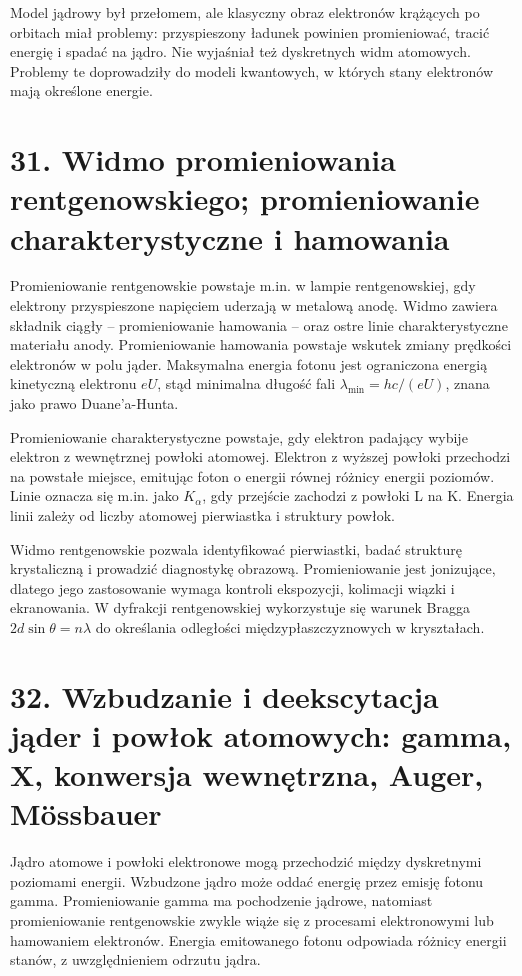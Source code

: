 \documentclass[11pt,a4paper,oneside]{report}
\begin{document}
Model jądrowy był przełomem, ale klasyczny obraz elektronów krążących po orbitach miał problemy: przyspieszony ładunek powinien promieniować, tracić energię i spadać na jądro. Nie wyjaśniał też dyskretnych widm atomowych. Problemy te doprowadziły do modeli kwantowych, w których stany elektronów mają określone energie.

\section{31. Widmo promieniowania rentgenowskiego; promieniowanie charakterystyczne i hamowania}
Promieniowanie rentgenowskie powstaje m.in. w lampie rentgenowskiej, gdy elektrony przyspieszone napięciem uderzają w metalową anodę. Widmo zawiera składnik ciągły – promieniowanie hamowania – oraz ostre linie charakterystyczne materiału anody. Promieniowanie hamowania powstaje wskutek zmiany prędkości elektronów w polu jąder. Maksymalna energia fotonu jest ograniczona energią kinetyczną elektronu \(eU\), stąd minimalna długość fali \(\lambda_{\min}=hc/(eU)\), znana jako prawo Duane’a-Hunta.

Promieniowanie charakterystyczne powstaje, gdy elektron padający wybije elektron z wewnętrznej powłoki atomowej. Elektron z wyższej powłoki przechodzi na powstałe miejsce, emitując foton o energii równej różnicy energii poziomów. Linie oznacza się m.in. jako \(K_\alpha\), gdy przejście zachodzi z powłoki L na K. Energia linii zależy od liczby atomowej pierwiastka i struktury powłok.

Widmo rentgenowskie pozwala identyfikować pierwiastki, badać strukturę krystaliczną i prowadzić diagnostykę obrazową. Promieniowanie jest jonizujące, dlatego jego zastosowanie wymaga kontroli ekspozycji, kolimacji wiązki i ekranowania. W dyfrakcji rentgenowskiej wykorzystuje się warunek Bragga \(2d\sin\theta=n\lambda\) do określania odległości międzypłaszczyznowych w kryształach.

\section{32. Wzbudzanie i deekscytacja jąder i powłok atomowych: gamma, X, konwersja wewnętrzna, Auger, Mössbauer}
Jądro atomowe i powłoki elektronowe mogą przechodzić między dyskretnymi poziomami energii. Wzbudzone jądro może oddać energię przez emisję fotonu gamma. Promieniowanie gamma ma pochodzenie jądrowe, natomiast promieniowanie rentgenowskie zwykle wiąże się z procesami elektronowymi lub hamowaniem elektronów. Energia emitowanego fotonu odpowiada różnicy energii stanów, z uwzględnieniem odrzutu jądra.
\end{document}

